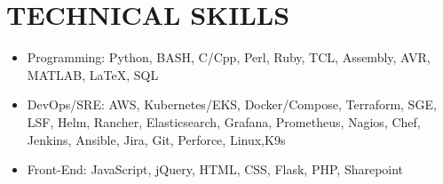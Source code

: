 \documentclass[line,margin]{res}
\begin{document}
\begin{resume}
\begin{adjustwidth}{-115pt}{0pt}

\end{adjustwidth}

\section{TECHNICAL SKILLS}
\vspace{25px}
\begin{adjustwidth}{-115pt}{0pt}
	\begin{itemize}
		\item Programming: Python, BASH, C/Cpp, Perl, Ruby, TCL, Assembly, AVR, MATLAB, \LaTeX, SQL
		\item DevOps/SRE: AWS, Kubernetes/EKS, Docker/Compose, Terraform, SGE, LSF, Helm, Rancher, Elasticsearch, Grafana, Prometheus, Nagios, Chef, Jenkins, Ansible, Jira, Git, Perforce, Linux,K9s
		\item Front-End: JavaScript, jQuery, HTML, CSS, Flask, PHP, Sharepoint
	\end{itemize}
\end{adjustwidth}


\end{resume}
\end{document}
